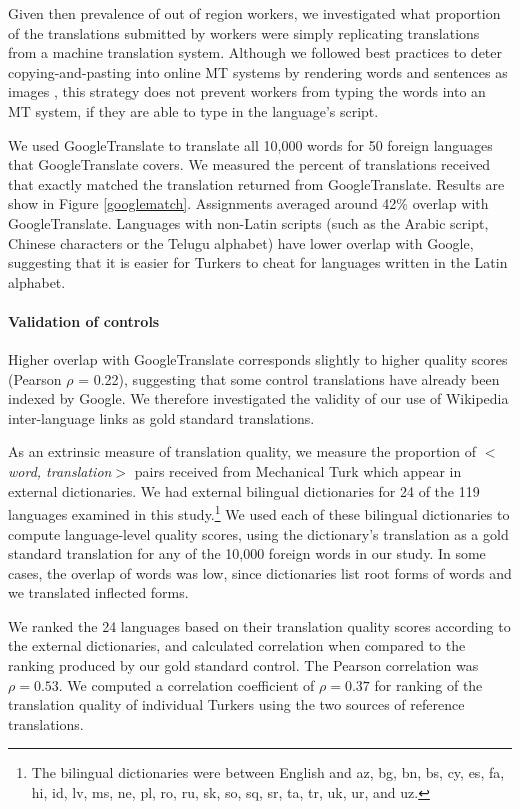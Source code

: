 \documentclass[11pt]{article}
\begin{document}
Given then prevalence of out of region workers, we investigated what proportion of the translations submitted by workers were simply replicating translations from a machine translation system.  Although we followed best practices to deter copying-and-pasting into online MT systems  by  rendering words and sentences as images \cite{zaidan-callisonburch:2011:ACL-HLT2011a}, this strategy does not prevent workers from typing the words into an MT system, if they are able to type in the language's script. 

We used GoogleTranslate to translate all 10,000 words for 50 foreign languages that GoogleTranslate covers. We measured the percent of translations received that exactly matched the translation returned from GoogleTranslate. Results are show in Figure \ref{googlematch}. 
Assignments averaged around 42\% overlap with GoogleTranslate.  Languages with non-Latin scripts (such as the Arabic script, Chinese characters or the Telugu alphabet) have lower overlap with Google,  suggesting that it is easier for Turkers to cheat for languages written in the Latin alphabet. 

\paragraph{Validation of controls} 
Higher overlap with GoogleTranslate corresponds slightly to higher quality scores (Pearson $\rho$ = 0.22), suggesting that some control translations have already been indexed by Google. We therefore investigated the validity of our use of Wikipedia inter-language links as gold standard translations.

As an extrinsic measure of translation quality, we measure the proportion of $<${\it word, translation}$>$ pairs received from Mechanical Turk which appear in external dictionaries.  We had external bilingual dictionaries for 24 of the 119 languages examined in this study.\footnote{The bilingual dictionaries were between English and az, bg, bn, bs, cy, es, fa, hi, id, lv, ms, ne, pl, ro, ru, sk, so, sq, sr, ta, tr, uk, ur, and uz. }  We used each of these bilingual dictionaries to compute language-level quality scores, using the dictionary's translation as a gold standard translation for any of the 10,000 foreign words in our study.  In some cases, the overlap of words was low, since dictionaries list root forms of words and we translated inflected forms.  

We ranked the 24 languages based on their translation quality scores according to the external dictionaries, and calculated correlation when compared to the ranking produced by our gold standard control.  The Pearson correlation was $\rho=0.53$.  We computed a correlation coefficient of $\rho=0.37$ for ranking of the translation quality of individual Turkers using the two sources of reference translations.    
\end{document}
